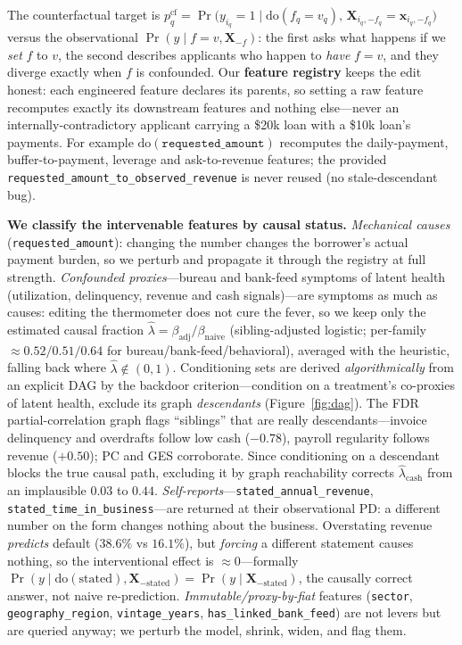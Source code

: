 \documentclass[11pt]{article}
\newcommand{\code}[1]{\texttt{#1}}
\begin{document}
The counterfactual target is
$p_q^{\mathrm{cf}} = \Pr\!\big(y_{i_q}{=}1 \mid \mathrm{do}(f_q{=}v_q),\,
\mathbf{X}_{i_q,-f_q}{=}\mathbf{x}_{i_q,-f_q}\big)$ versus the observational
$\Pr(y \mid f{=}v, \mathbf{X}_{-f})$: the first asks what happens if we \emph{set} $f$ to $v$,
the second describes applicants who happen to \emph{have} $f{=}v$, and they diverge exactly
when $f$ is confounded. Our \textbf{feature registry} keeps the edit honest: each engineered
feature declares its parents, so setting a raw feature recomputes exactly its downstream
features and nothing else---never an internally-contradictory applicant carrying a \$20k loan
with a \$10k loan's payments. For example $\mathrm{do}(\code{requested\_amount})$ recomputes the
daily-payment, buffer-to-payment, leverage and ask-to-revenue features; the provided
\code{requested\_amount\_to\_observed\_revenue} is never reused (no stale-descendant bug).

\textbf{We classify the intervenable features by causal status.} \emph{Mechanical causes}
(\code{requested\_amount}): changing the number changes the borrower's actual payment burden,
so we perturb and propagate it through the registry at full strength. \emph{Confounded
proxies}---bureau and bank-feed symptoms of latent health (utilization, delinquency, revenue
and cash signals)---are symptoms as much as causes: editing the thermometer does not cure the
fever, so we keep only the estimated causal fraction
$\hat\lambda = \beta_{\text{adj}}/\beta_{\text{naive}}$ (sibling-adjusted logistic; per-family
$\approx 0.52/0.51/0.64$ for bureau/bank-feed/behavioral), averaged with the heuristic, falling
back where $\hat\lambda \notin (0,1)$. Conditioning sets are derived
\emph{algorithmically} from an explicit DAG by the backdoor criterion---condition on a
treatment's co-proxies of latent health, exclude its graph \emph{descendants}
(Figure~\ref{fig:dag}). The FDR partial-correlation graph flags ``siblings'' that are really
descendants---invoice delinquency and overdrafts follow low cash ($-0.78$), payroll regularity
follows revenue ($+0.50$); PC and GES corroborate. Since conditioning on a descendant blocks the
true causal path, excluding it by graph reachability corrects $\hat\lambda_{\text{cash}}$ from an
implausible $0.03$ to $0.44$.
\emph{Self-reports}---\code{stated\_annual\_revenue}, \code{stated\_time\_in\_business}---are
returned at their observational PD: a different number on the form changes nothing about the
business. Overstating revenue \emph{predicts} default ($38.6\%$ vs $16.1\%$), but \emph{forcing}
a different statement causes nothing, so the interventional effect is $\approx 0$---formally
$\Pr(y \mid \mathrm{do}(\text{stated}), \mathbf{X}_{-\text{stated}}) =
\Pr(y \mid \mathbf{X}_{-\text{stated}})$, the causally correct answer, not naive re-prediction.
\emph{Immutable/proxy-by-fiat} features (\code{sector}, \code{geography\_region},
\code{vintage\_years}, \code{has\_linked\_bank\_feed}) are not levers but are queried anyway; we
perturb the model, shrink, widen, and flag them.
\end{document}
